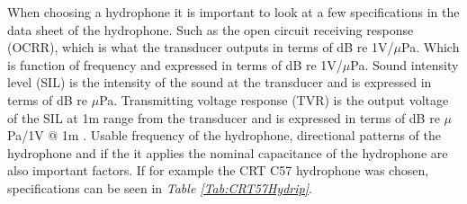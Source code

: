 When choosing a hydrophone it is important to look at a few specifications in the data sheet of the hydrophone. 
Such as the open circuit receiving response (OCRR), which is what the transducer outputs in terms of dB re 1V/$\mu$Pa.
Which is function of frequency and expressed in terms of dB re 1V/$\mu$Pa.
Sound intensity level (SIL) is the intensity of the sound at the transducer and is expressed in terms of dB re $\mu$Pa.
Transmitting voltage response (TVR) is the output voltage of the SIL at 1m range from the transducer and is expressed in terms of dB re $\mu$Pa/1V @ 1m \cite{ethem_mutlu_sozer_underwater_nodate}. 
Usable frequency of the hydrophone, directional patterns of the hydrophone and if the it applies the nominal capacitance of the hydrophone are also important factors. 
If for example the CRT C57 hydrophone was chosen, specifications can be seen in \textit{Table \ref{Tab:CRT57Hydrip}}.

\newpage


